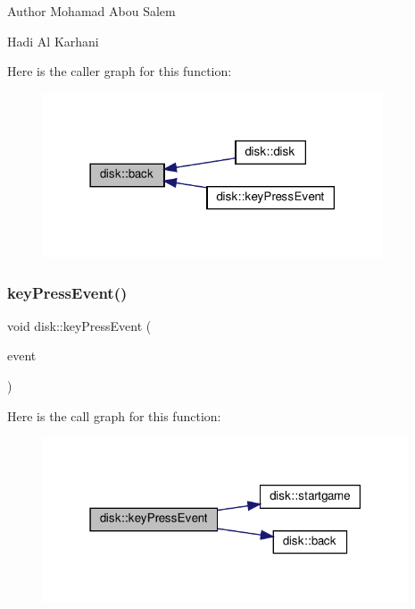 \begin{DoxyAuthor}{Author}
Mohamad Abou Salem 

Hadi Al Karhani 
\end{DoxyAuthor}
Here is the caller graph for this function\+:
\nopagebreak
\begin{figure}[H]
\begin{center}
\leavevmode
\includegraphics[width=285pt]{classdisk_a9bff15b70a60d9264183141046d172ed_icgraph}
\end{center}
\end{figure}
\mbox{\label{classdisk_a24be400d4bdc6900427e2236abdfe67b}} 
\subsubsection{\texorpdfstring{key\+Press\+Event()}{keyPressEvent()}}
{\footnotesize\ttfamily void disk\+::key\+Press\+Event (\begin{DoxyParamCaption}\item[{Q\+Key\+Event $\ast$}]{event }\end{DoxyParamCaption})\hspace{0.3cm}{\ttfamily [inline]}}

Here is the call graph for this function\+:
\nopagebreak
\begin{figure}[H]
\begin{center}
\leavevmode
\includegraphics[width=307pt]{classdisk_a24be400d4bdc6900427e2236abdfe67b_cgraph}
\end{center}
\end{figure}
\mbox{\label{classdisk_a5b39c1a38b5a5c337c6b60470b9ef748}} 
